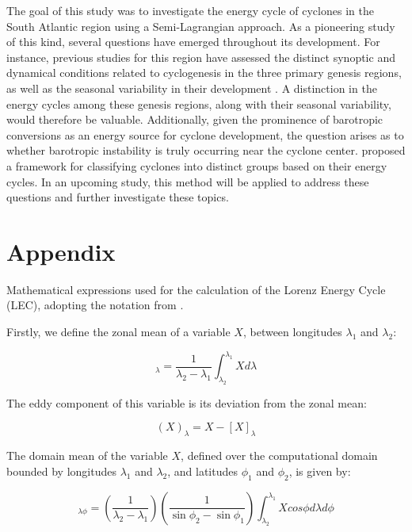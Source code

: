 \documentclass[pdflatex,sn-chicago]{sn-jnl}%
\theoremstyle{plain}
\theoremstyle{definition}
\theoremstyle{remark}
\theoremstyle{definition}
\begin{document}
The goal of this study was to investigate the energy cycle of cyclones in the South Atlantic region using a Semi-Lagrangian approach. As a pioneering study of this kind, several questions have emerged throughout its development. For instance, previous studies for this region have assessed the distinct synoptic and dynamical conditions related to cyclogenesis in the three primary genesis regions, as well as the seasonal variability in their development \citep{gramcianinov2019properties, crespo2021potential}. A distinction in the energy cycles among these genesis regions, along with their seasonal variability, would therefore be valuable. Additionally, given the prominence of barotropic conversions as an energy source for cyclone development, the question arises as to whether barotropic instability is truly occurring near the cyclone center. \citet{souza2024thesis} proposed a framework for classifying cyclones into distinct groups based on their energy cycles. In an upcoming study, this method will be applied to address these questions and further investigate these topics.


\backmatter



\section*{Appendix}


Mathematical expressions used for the calculation of the Lorenz Energy Cycle (LEC), adopting the notation from \citet{michaelides1987limited}. 


Firstly, we define the zonal mean of a variable $X$, between longitudes $\lambda_{1}$ and $\lambda_{2}$:

 \begin{equation}
     [X]_\lambda = \frac{1}{\lambda_2 - \lambda_1} \int_{\lambda_2}^{\lambda_1} X d\lambda
 \end{equation}

The eddy component of this variable is its deviation from the zonal mean:

\begin{equation}
    (X)_\lambda =  X - [X]_\lambda
\end{equation}

The domain mean of the variable $X$, defined over the computational domain bounded by longitudes $\lambda_1$ and $\lambda_2$, and latitudes $\phi_1$ and $\phi_2$, is given by:

\begin{equation}
    [X]_{\lambda\phi} = \left(\frac{1}{\lambda_2 - \lambda_1}\right)  \left(\frac{1}{\sin\phi_2 - \sin\phi_1}\right) \int_{\lambda_2}^{\lambda_1} X cos\phi d\lambda d\phi 
\end{equation}
\end{document}
